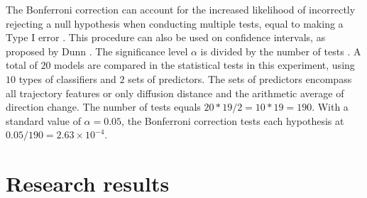 \let\LaTeXcline\cline\documentclass[sn-mathphys-num]{sn-jnl}\let\cline\LaTeXcline
\begin{document}
The Bonferroni correction \cite{bonferroni1936teoria} can account for the increased likelihood of incorrectly rejecting a null hypothesis when conducting multiple tests, equal to making a Type I error \cite{mittelhammer2000econometric}. This procedure can also be used on confidence intervals, as proposed by Dunn \cite{dunn1961multiple}. The significance level $\alpha$ is divided by the number of tests \cite{rupert2012simultaneous}. A total of $20$ models are compared in the statistical tests in this experiment, using $10$ types of classifiers and $2$ sets of predictors. The sets of predictors encompass all trajectory features or only diffusion distance and the arithmetic average of direction change. The number of tests equals $20 * 19 / 2 = 10 * 19 = 190$. With a standard value of $\alpha = 0.05$, the Bonferroni correction tests each hypothesis at $0.05 / 190 = 2.63 \times 10 ^{-4}$.

\section{Research results}
\label{sec:Results}
\end{document}
